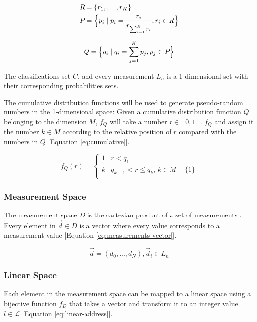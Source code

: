\documentclass[letterpaper, conference]{IEEEtran}
\begin{document}
\begin{equation}\label{eq:pmf}
  \begin{aligned}
  R &= \{r_1, \dots, r_K\} \\
  P &= \Bigl\{p_i \mid p_i = \frac{r_i}{r_{\sum_{i = 1}^{K} r_i}}, r_i \in R \Bigr\}
  \end{aligned}
\end{equation}

\begin{equation}\label{eq:cdf}
Q = \Bigl\{q_i \mid q_i = \sum_{j = 1}^{K} p_j, p_j \in P \Bigr\}
\end{equation}

The classifications set $C$, and every measurement $L_n$ is a 1-dimensional set with their corresponding probabilities sets.

The cumulative distribution functions will be used to generate pseudo-random numbers in the 1-dimensional space: Given a cumulative distribution function $Q$ belonging to the dimension $M$, $f_Q$ will take a number $r \in [0, 1]$. $f_Q$ and assign it the number $k \in M$ according to the relative position of $r$ compared with the numbers in $Q$ [Equation \ref{eq:cumulative}].

\begin{equation}\label{eq:cumulative}
  f_Q(r) =
  \begin{cases}
  1 & r < q_1 \\
  k & q_{k - 1} < r \leq q_k,\, k \in M - \{1\} \\
  \end{cases}
\end{equation}

\subsubsection{Measurement Space}
The measurement space $D$ is the cartesian product of a set of measurements \label{eq:measurement-space}. Every element in $\vec{d} \in D$ is a vector where every value corresponds to a measurement value [Equation \ref{eq:measurements-vector}].

\begin{equation}\label{eq:measurements-vector}
  \vec{d} = (d_0, ..., d_N), \vec{d}_i \in L_n
\end{equation}

\subsubsection{Linear Space}
Each element in the measurement space can be mapped to a linear space using a bijective function $f_D$ that takes a vector and transform it to an integer value $l \in \mathcal{L}$ [Equation \ref{eq:linear-address}].
\end{document}
